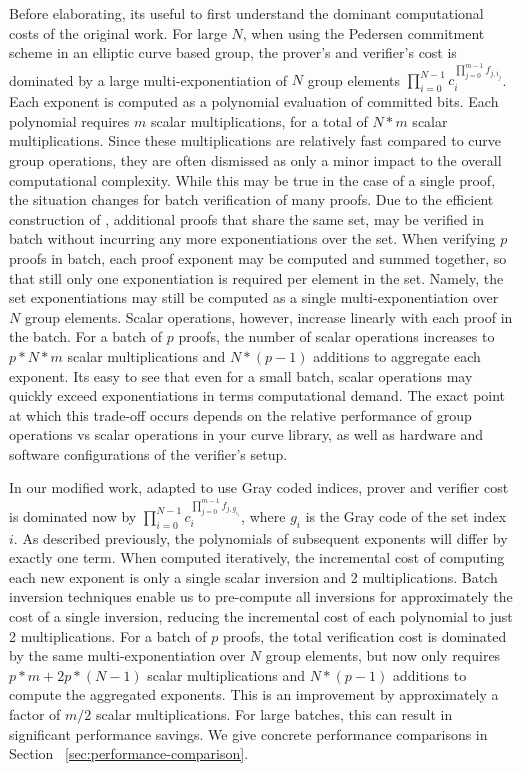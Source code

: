\documentclass{article}
\begin{document}
Before elaborating, its useful to first understand the dominant computational costs of the original work. For large $N$, when using the Pedersen commitment scheme in an elliptic curve based group, the prover's and verifier's cost is dominated by a large multi-exponentiation of $N$ group elements $\prod_{i=0}^{N-1}c_i^{\prod_{j=0}^{m-1}f_{j,i_j}}$. Each exponent is computed as a polynomial evaluation of committed bits. Each polynomial requires $m$ scalar multiplications, for a total of $N*m$ scalar multiplications. Since these multiplications are relatively fast compared to curve group operations, they are often dismissed as only a minor impact to the overall computational complexity. While this may be true in the case of a single proof, the situation changes for batch verification of many proofs. Due to the efficient construction of \cite{groth}, additional proofs that share the same set, may be verified in batch without incurring any more exponentiations over the set. When verifying $p$ proofs in batch, each proof exponent may be computed and summed together, so that still only one exponentiation is required per element in the set. Namely, the set exponentiations may still be computed as a single multi-exponentiation over $N$ group elements. Scalar operations, however, increase linearly with each proof in the batch. For a batch of $p$ proofs, the number of scalar operations increases to $p*N*m$ scalar multiplications and $N*(p-1)$ additions to aggregate each exponent. Its easy to see that even for a small batch, scalar operations may quickly exceed exponentiations in terms computational demand. The exact point at which this trade-off occurs depends on the relative performance of group operations vs scalar operations in your curve library, as well as hardware and software configurations of the verifier's setup.

In our modified work, adapted to use Gray coded indices, prover and verifier cost is dominated now by $\prod_{i=0}^{N-1}c_i^{\prod_{j=0}^{m-1}f_{j,g_{i_j}}}$, where $g_i$ is the Gray code of the set index $i$. As described previously, the polynomials of subsequent exponents will differ by exactly one term. When computed iteratively, the incremental cost of computing each new exponent is only a single scalar inversion and 2 multiplications. Batch inversion techniques enable us to pre-compute all inversions for approximately the cost of a single inversion, reducing the incremental cost of each polynomial to just 2 multiplications. For a batch of $p$ proofs, the total verification cost is dominated by the same multi-exponentiation over $N$ group elements, but now only requires $p*m + 2p*(N-1)$ scalar multiplications and $N*(p-1)$ additions to compute the aggregated exponents. This is an improvement by approximately a factor of $m/2$ scalar multiplications. For large batches, this can result in significant performance savings. We give concrete performance comparisons in Section ~\ref{sec:performance-comparison}.
\end{document}
